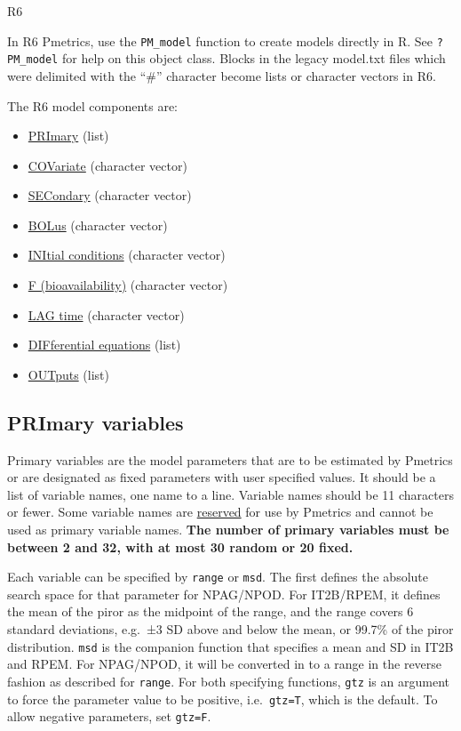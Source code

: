 \documentclass[
]{book}
\providecommand{\tightlist}{%
  \setlength{\itemsep}{0pt}\setlength{\parskip}{0pt}}
\begin{document}
{R6}

In R6 Pmetrics, use the \texttt{PM\_model} function to create models directly
in R. See \texttt{?PM\_model} for help on this object class. Blocks in the legacy model.txt files which were delimited with the ``\#'' character become lists or character vectors in R6.

The R6 model components are:

\begin{itemize}
\tightlist
\item
  \protect\hyperlink{priR6}{PRImary} (list)
\item
  \protect\hyperlink{covR6}{COVariate} (character vector)
\item
  \protect\hyperlink{secR6}{SECondary} (character vector)
\item
  \protect\hyperlink{bolR6}{BOLus} (character vector)
\item
  \protect\hyperlink{iniR6}{INItial conditions} (character vector)
\item
  \protect\hyperlink{FaR6}{F (bioavailability)} (character vector)
\item
  \protect\hyperlink{lagR6}{LAG time} (character vector)
\item
  \protect\hyperlink{diffR6}{DIFferential equations} (list)
\item
  \protect\hyperlink{outR6}{OUTputs} (list)
\end{itemize}

\hypertarget{priR6}{%
\subsection{PRImary variables}\label{priR6}}

Primary variables are the model parameters that are to be estimated by
Pmetrics or are designated as fixed parameters with user specified
values. It should be a list of variable names, one name to a line.
Variable names should be 11 characters or fewer. Some variable names are
\protect\hyperlink{reserved}{reserved} for use by Pmetrics and cannot be used as
primary variable names. \textbf{The number of primary variables must be
between 2 and 32, with at most 30 random or 20 fixed.}

Each variable can be specified by \texttt{range} or \texttt{msd}. The first defines the absolute search space for that parameter for NPAG/NPOD. For IT2B/RPEM, it defines the mean of the piror as the midpoint of the range, and the range covers 6 standard deviations, e.g.~±3 SD above and below the mean, or 99.7\% of the piror distribution. \texttt{msd} is the companion function that specifies a mean and SD in IT2B and RPEM. For NPAG/NPOD, it will be converted in to a range in the reverse fashion as described for \texttt{range}. For both specifying functions, \texttt{gtz} is an argument to force the parameter value to be positive, i.e.~\texttt{gtz=T}, which is the default. To allow negative parameters, set \texttt{gtz=F}.
\end{document}
